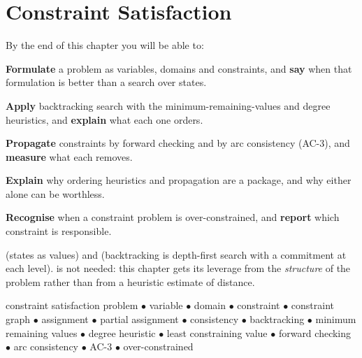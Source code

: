 \chapter{Constraint Satisfaction}\label{ch:csp}

\begin{outcomes}
By the end of this chapter you will be able to:
\begin{tight}
  \item \textbf{Formulate} a problem as variables, domains and constraints, and
        \textbf{say} when that formulation is better than a search over states.
  \item \textbf{Apply} backtracking search with the minimum-remaining-values and
        degree heuristics, and \textbf{explain} what each one orders.
  \item \textbf{Propagate} constraints by forward checking and by arc consistency
        (AC-3), and \textbf{measure} what each removes.
  \item \textbf{Explain} why ordering heuristics and propagation are a package,
        and why either alone can be worthless.
  \item \textbf{Recognise} when a constraint problem is over-constrained, and
        \textbf{report} which constraint is responsible.
\end{tight}
\end{outcomes}

\begin{prereq}
 (states as values) and  (backtracking is
depth-first search with a commitment at each level).  is not
needed: this chapter gets its leverage from the \emph{structure} of the problem
rather than from a heuristic estimate of distance.
\end{prereq}

\begin{keyterms}
constraint satisfaction problem $\bullet$ variable $\bullet$ domain $\bullet$
constraint $\bullet$ constraint graph $\bullet$ assignment $\bullet$ partial
assignment $\bullet$ consistency $\bullet$ backtracking $\bullet$ minimum
remaining values $\bullet$ degree heuristic $\bullet$ least constraining value
$\bullet$ forward checking $\bullet$ arc consistency $\bullet$ AC-3 $\bullet$
over-constrained
\end{keyterms}

